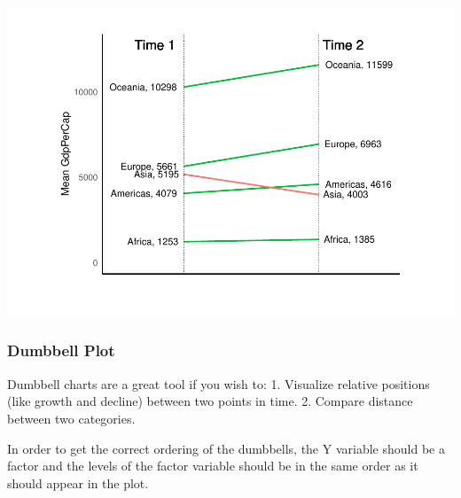 \documentclass[a4paper]{article}
\begin{document}
\includegraphics{M24-ggplot2_Gallery_files/figure-latex/unnamed-chunk-20-1.pdf}

\newpage

\subsubsection{Dumbbell Plot}\label{dumbbell-plot}

Dumbbell charts are a great tool if you wish to: 1. Visualize relative
positions (like growth and decline) between two points in time. 2.
Compare distance between two categories.

In order to get the correct ordering of the dumbbells, the Y variable
should be a factor and the levels of the factor variable should be in
the same order as it should appear in the plot.
\end{document}
